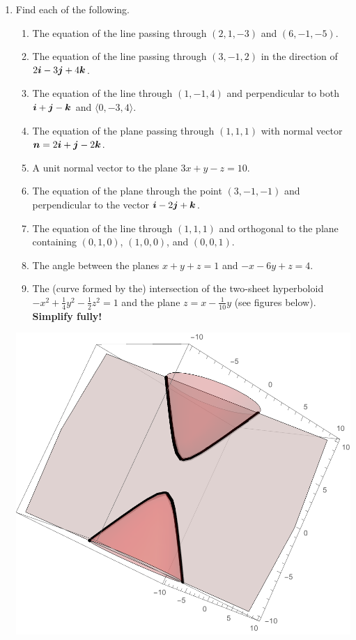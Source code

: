 \documentclass[12 pt]{article}
\newcommand{\compslong}[3]{\langle #1, #2, #3\rangle}
\newcommand{\ijk}[2]{#1\vect{#2}}
\begin{document}
\begin{enumerate}[leftmargin=0in, rightmargin=-0.25in]
	\item Find each of the following.
	\begin{enumerate}
		\item The equation of the line passing through $(2,1,-3)$ and $(6,-1,-5)$.
		\item The equation of the line passing through $(3,-1,2)$ in the direction of $\ijk{2}{i}-\ijk{3}{j}+\ijk{4}{k}$.
		\item The equation of the line through $(1,-1,4)$ and perpendicular to both $\boldsymbol{i}+\boldsymbol{j}-\boldsymbol{k}$ and $\compslong{0}{-3}{4}$.
		\item The equation of the plane passing through $(1,1,1)$ with normal vector $\vect{n}=\ijk{2}{i}+\ijk{}{j}-\ijk{2}{k}$.
		\item A unit normal vector to the plane $3x+y-z=10$.
		\item The equation of the plane through the point $(3,-1,-1)$ and perpendicular to the vector $\ijk{}{i}-\ijk{2}{j}+\ijk{}{k}$.
		\item The equation of the line through $(1,1,1)$ and orthogonal to the plane containing $(0,1,0)$, $(1,0,0)$, and $(0,0,1)$.
		\item The angle between the planes $x+y+z=1$ and $-x-6y+z=4$.
		\item The (curve formed by the) intersection of the two-sheet hyperboloid $-x^2+\frac{1}{4}y^2-\frac{1}{2}z^2=1$ and the plane $z=x-\frac{1}{10}y$ (see figures below).  \textbf{Simplify fully!}
	\end{enumerate}
	\vfill
	\begin{center}
		\includegraphics[scale=0.44]{PlaneHyperboloid}\hspace{1in}

\end{center}
\end{enumerate}
\end{document}
